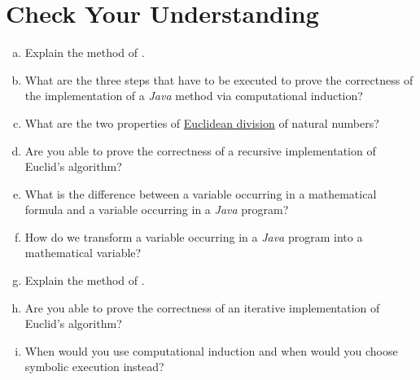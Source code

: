 \section{Check Your Understanding}
\begin{enumerate}[(a)]
\item Explain the method of .  
\item What are the three steps that have to be executed to prove the correctness of the implementation of a
      \textsl{Java} method via computational induction?
\item What are the two properties of \href{https://en.wikipedia.org/wiki/Euclidean_division}{Euclidean division} of natural numbers?
\item Are you able to prove the correctness of a recursive implementation of Euclid's algorithm?
\item What is the difference between a variable occurring in a mathematical formula and a variable occurring in
      a \textsl{Java} program?
\item How do we transform a variable occurring in a \textsl{Java} program into a mathematical variable?
\item Explain the method of .
\item Are you able to prove the correctness of an iterative implementation of Euclid's algorithm?
\item When would you use computational induction and when would you choose symbolic execution instead?
\end{enumerate}

